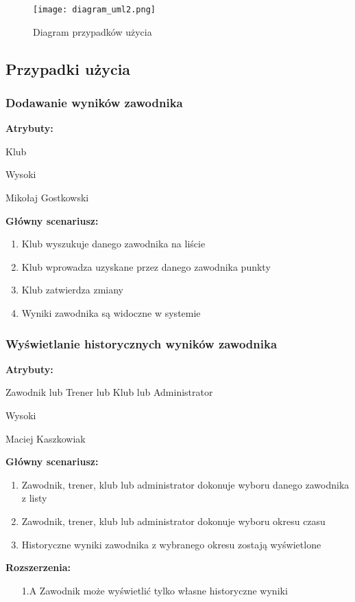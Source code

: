 \documentclass[polish, a4paper]{article}
\begin{document}
\begin{figure}[H]
  \centering
  \texttt{[image: diagram\_uml2.png]}
  \caption{Diagram przypadków użycia}
\end{figure}



\subsection{Przypadki użycia}


\subsubsection{Dodawanie wyników zawodnika}
\noindent
\textbf{Atrybuty:}
\begin{description}[labelindent=0.5cm]
    \item[Główny aktor:]{Klub}
    \item[Priorytet:]{Wysoki}
    \item[Źródło:]{Mikołaj Gostkowski}
\end{description}

\noindent
\textbf{Główny scenariusz:}
\begin{enumerate}
    \item Klub wyszukuje danego zawodnika na liście
    \item Klub wprowadza uzyskane przez danego zawodnika punkty
    \item Klub zatwierdza zmiany
    \item Wyniki zawodnika są widoczne w systemie
\end{enumerate}


\subsubsection{Wyświetlanie historycznych wyników zawodnika}
\noindent
\textbf{Atrybuty:}
\begin{description}[labelindent=0.5cm]
    \item[Główny aktor:]{Zawodnik lub Trener lub Klub lub Administrator}
    \item[Priorytet:]{Wysoki}
    \item[Źródło:]{Maciej Kaszkowiak}
\end{description}

\noindent
\textbf{Główny scenariusz:}
\begin{enumerate}
    \item Zawodnik, trener, klub lub administrator dokonuje wyboru danego zawodnika z listy
    \item Zawodnik, trener, klub lub administrator dokonuje wyboru okresu czasu
    \item Historyczne wyniki zawodnika z wybranego okresu zostają wyświetlone
\end{enumerate}
\noindent
\textbf{Rozszerzenia:}
\begin{itemize}
    \item[1.A] Zawodnik może wyświetlić tylko własne historyczne wyniki
\end{itemize}
\end{document}
